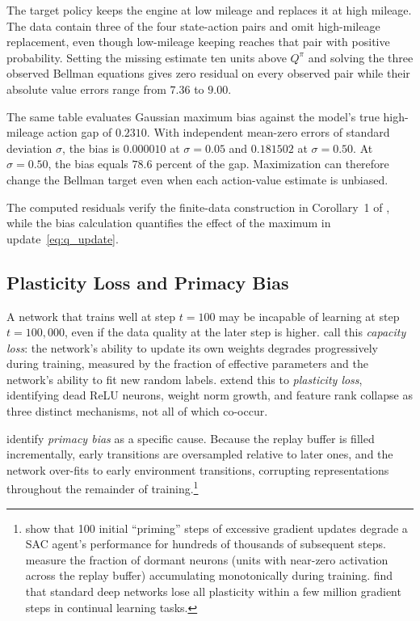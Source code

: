 The target policy keeps the engine at low mileage and replaces it at high mileage. The data contain three of the four state-action pairs and omit high-mileage replacement, even though low-mileage keeping reaches that pair with positive probability. Setting the missing estimate ten units above $Q^\pi$ and solving the three observed Bellman equations gives zero residual on every observed pair while their absolute value errors range from $7.36$ to $9.00$.

The same table evaluates Gaussian maximum bias against the model's true high-mileage action gap of $0.2310$. With independent mean-zero errors of standard deviation $\sigma$, the bias is $0.000010$ at $\sigma=0.05$ and $0.181502$ at $\sigma=0.50$. At $\sigma=0.50$, the bias equals $78.6$ percent of the gap. Maximization can therefore change the Bellman target even when each action-value estimate is unbiased.

The computed residuals verify the finite-data construction in Corollary~1 of \citet{Fujimoto2022}, while the bias calculation quantifies the effect of the maximum in update~\eqref{eq:q_update}.
\FloatBarrier

\subsection{Plasticity Loss and Primacy Bias}
\label{sec:plasticity}

A network that trains well at step $t = 100$ may be incapable of learning at step $t = 100{,}000$, even if the data quality at the later step is higher. \citet{Lyle2022} call this \emph{capacity loss}: the network's ability to update its own weights degrades progressively during training, measured by the fraction of effective parameters and the network's ability to fit new random labels. \citet{Lyle2023} extend this to \emph{plasticity loss}, identifying dead ReLU neurons, weight norm growth, and feature rank collapse as three distinct mechanisms, not all of which co-occur.

\citet{Nikishin2022} identify \emph{primacy bias} as a specific cause. Because the replay buffer is filled incrementally, early transitions are oversampled relative to later ones, and the network over-fits to early environment transitions, corrupting representations throughout the remainder of training.\footnote{\citet{Nikishin2022} show that 100 initial ``priming'' steps of excessive gradient updates degrade a SAC agent's performance for hundreds of thousands of subsequent steps. \citet{Sokar2023} measure the fraction of dormant neurons (units with near-zero activation across the replay buffer) accumulating monotonically during training. \citet{DohareEtAl2024} find that standard deep networks lose all plasticity within a few million gradient steps in continual learning tasks.}

